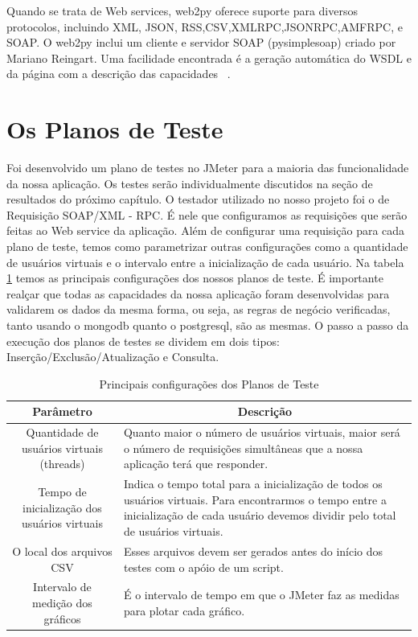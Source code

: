 Quando se trata de Web services, web2py oferece suporte para diversos protocolos, incluindo XML, JSON, RSS,CSV,XMLRPC,JSONRPC,AMFRPC, e SOAP.  O web2py inclui um cliente e servidor SOAP (pysimplesoap) criado por Mariano Reingart. Uma facilidade encontrada é a geração automática do WSDL e da página com a descrição das capacidades ~\cite{siteweb2py}.

\section{Os Planos de Teste}

Foi desenvolvido um plano de testes no JMeter para a maioria das funcionalidade da nossa aplicação. Os testes serão individualmente discutidos na seção de resultados do próximo capítulo. O testador utilizado no nosso projeto foi o de Requisição SOAP/XML - RPC. É nele que configuramos as requisições que serão feitas ao Web service da aplicação. Além de configurar uma requisição para cada plano de teste, temos como parametrizar outras configurações como a quantidade de usuários virtuais e o intervalo entre a inicialização de cada usuário. Na tabela \ref{tab:configplanoteste} temos as principais configurações dos nossos planos de teste. É importante realçar que todas as capacidades da nossa aplicação foram desenvolvidas para validarem os dados da mesma forma, ou seja, as regras de negócio verificadas, tanto usando o mongodb quanto o postgresql, são as mesmas. O passo a passo da execução dos planos de testes se dividem em dois tipos: Inserção/Exclusão/Atualização e Consulta.

\begin{table}
	\caption{Principais configurações dos Planos de Teste}
	\begin{center}
	\begin{tabularx}{\textwidth}{ | c | X | }
	\hline
		\textbf{Parâmetro} & \multicolumn{1}{c|}{\textbf{Descrição}} \\
	\hline
		Quantidade de usuários virtuais (threads) & Quanto maior o número de usuários virtuais, maior será o número de requisições simultâneas que a nossa aplicação terá que responder.\\
	\hline 
		Tempo de inicialização dos usuários virtuais & Indica o tempo total para a inicialização de todos os usuários virtuais. Para encontrarmos o tempo entre a inicialização de cada usuário devemos dividir pelo total de usuários virtuais.\\
	\hline
		O local dos arquivos CSV & Esses arquivos devem ser gerados antes do início dos testes com o apóio de um script.\\
	\hline
		Intervalo de medição dos gráficos & É o intervalo de tempo em que o JMeter faz as medidas para plotar cada gráfico.\\
	\hline
	\end {tabularx}
	\end{center}
	\label{tab:configplanoteste}
\end{table}

